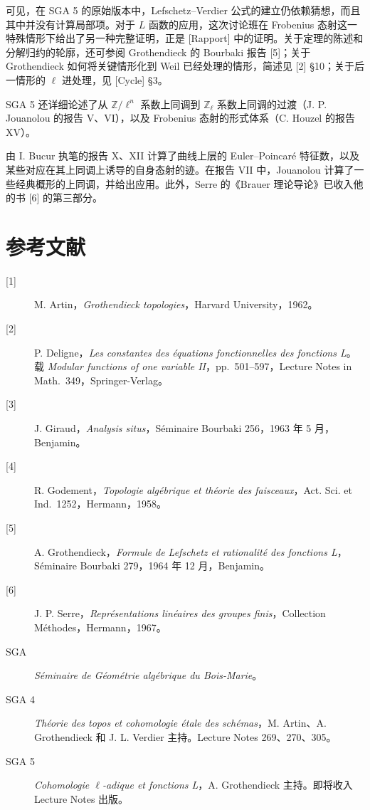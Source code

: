 可见，在 SGA 5 的原始版本中，Lefschetz--Verdier 公式的建立仍依赖猜想，而且其中并没有计算局部项。对于 $L$ 函数的应用，这次讨论班在 Frobenius 态射这一特殊情形下给出了另一种完整证明，正是 [Rapport] 中的证明。关于定理的陈述和分解归约的轮廓，还可参阅 Grothendieck 的 Bourbaki 报告 [5]；关于 Grothendieck 如何将关键情形化到 Weil 已经处理的情形，简述见 [2] §10；关于后一情形的 $\ell$ 进处理，见 [Cycle] §3。

SGA 5 还详细论述了从 $\mathbb Z/\ell^n$ 系数上同调到 $\mathbb Z_\ell$ 系数上同调的过渡（J. P. Jouanolou 的报告 V、VI），以及 Frobenius 态射的形式体系（C. Houzel 的报告 XV）。

由 I. Bucur 执笔的报告 X、XII 计算了曲线上层的 Euler--Poincaré 特征数，以及某些对应在其上同调上诱导的自身态射的迹。在报告 VII 中，Jouanolou 计算了一些经典概形的上同调，并给出应用。此外，Serre 的《Brauer 理论导论》已收入他的书 [6] 的第三部分。

\section*{参考文献}
\begin{description}
\item[{[1]}] M. Artin，\textit{Grothendieck topologies}，Harvard University，1962。
\item[{[2]}] P. Deligne，\textit{Les constantes des équations fonctionnelles des fonctions L}。载 \textit{Modular functions of one variable II}，pp.~501--597，Lecture Notes in Math.~349，Springer-Verlag。
\item[{[3]}] J. Giraud，\textit{Analysis situs}，Séminaire Bourbaki 256，1963 年 5 月，Benjamin。
\item[{[4]}] R. Godement，\textit{Topologie algébrique et théorie des faisceaux}，Act. Sci. et Ind.~1252，Hermann，1958。
\item[{[5]}] A. Grothendieck，\textit{Formule de Lefschetz et rationalité des fonctions L}，Séminaire Bourbaki 279，1964 年 12 月，Benjamin。
\item[{[6]}] J. P. Serre，\textit{Représentations linéaires des groupes finis}，Collection Méthodes，Hermann，1967。
\item[SGA] \textit{Séminaire de Géométrie algébrique du Bois-Marie}。
\item[SGA 4] \textit{Théorie des topos et cohomologie étale des schémas}，M. Artin、A. Grothendieck 和 J. L. Verdier 主持。Lecture Notes 269、270、305。
\item[SGA 5] \textit{Cohomologie $\ell$-adique et fonctions L}，A. Grothendieck 主持。即将收入 Lecture Notes 出版。
\end{description}
